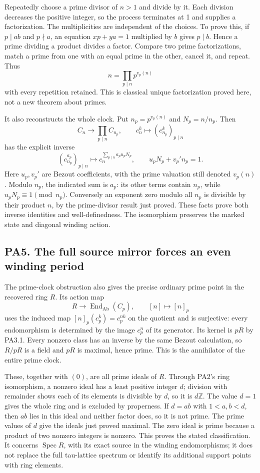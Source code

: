 Repeatedly choose a prime divisor of \(n>1\) and divide by it. Each division decreases the positive integer, so the process terminates at 1 and supplies a factorization. The multiplicities are independent of the choices. To prove this, if \(p\mid ab\) and \(p\nmid a\), an equation \(xp+ya=1\) multiplied by \(b\) gives \(p\mid b\). Hence a prime dividing a product divides a factor. Compare two prime factorizations, match a prime from one with an equal prime in the other, cancel it, and repeat. Thus \[
n=\prod_{p\mid n}p^{v_p(n)}
\] with every repetition retained. This is classical unique factorization proved here, not a new theorem about primes.

It also reconstructs the whole clock. Put \(n_p=p^{v_p(n)}\) and \(N_p=n/n_p\). Then \[
C_n\longrightarrow\prod_{p\mid n}C_{n_p},\qquad c_n^k\longmapsto(c_{n_p}^k)_{p\mid n}
\tag{PA4.2}
\] has the explicit inverse \[
(c_{n_p}^{a_p})_{p\mid n}\longmapsto
c_n^{\sum_{p\mid n}a_pu_pN_p},\qquad
u_pN_p+v_p' n_p=1.
\] Here \(u_p,v_p'\) are Bezout coefficients, with the prime valuation still denoted \(v_p(n)\). Modulo \(n_p\), the indicated sum is \(a_p\): its other terms contain \(n_p\), while \(u_pN_p\equiv1\pmod {n_p}\). Conversely an exponent zero modulo all \(n_p\) is divisible by their product \(n\), by the prime-divisor result just proved. These facts prove both inverse identities and well-definedness. The isomorphism preserves the marked state and diagonal winding action.

\subsection{PA5. The full source mirror forces an even winding period}\label{pa20260924-pa5.-the-full-source-mirror-forces-an-even-winding-period}

The prime-clock obstruction also gives the precise ordinary prime point in the recovered ring \(R\). Its action map \[
R\longrightarrow\operatorname{End}_{\mathrm{Ab}}(C_p),\qquad [n]\longmapsto[n]_p
\] uses the induced map \([n]_p(c_p^k)=c_p^{nk}\) on the quotient and is surjective: every endomorphism is determined by the image \(c_p^n\) of its generator. Its kernel is \(pR\) by PA3.1. Every nonzero class has an inverse by the same Bezout calculation, so \(R/pR\) is a field and \(pR\) is maximal, hence prime. This is the annihilator of the entire prime clock.

These, together with \((0)\), are all prime ideals of \(R\). Through PA2's ring isomorphism, a nonzero ideal has a least positive integer \(d\); division with remainder shows each of its elements is divisible by \(d\), so it is \(d\mathbb Z\). The value \(d=1\) gives the whole ring and is excluded by properness. If \(d=ab\) with \(1<a,b<d\), then \(ab\) lies in this ideal and neither factor does, so it is not prime. The prime values of \(d\) give the ideals just proved maximal. The zero ideal is prime because a product of two nonzero integers is nonzero. This proves the stated classification. It concerns \(\operatorname{Spec}R\), with its exact source in the winding endomorphisms; it does not replace the full tau-lattice spectrum or identify its additional support points with ring elements.

